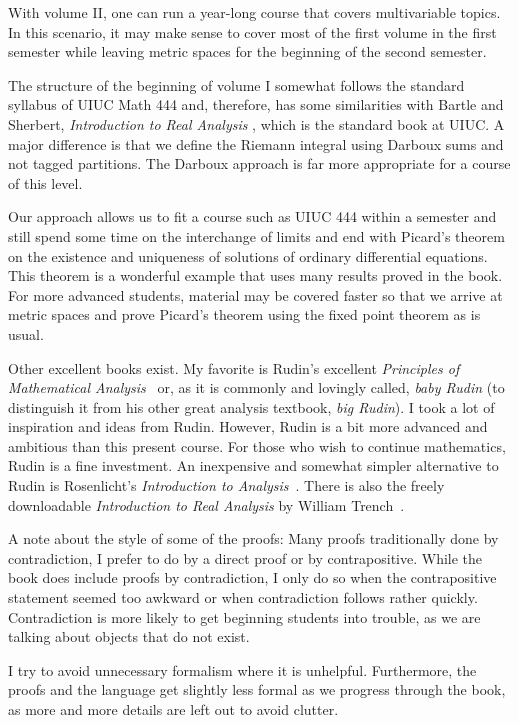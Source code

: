 With volume II\@, one can run a year-long course that covers multivariable
topics.  In this scenario, it may make sense to cover most of the first volume
in the first semester while leaving metric spaces for the beginning of the
second semester.

The structure of the beginning of volume I somewhat follows the
standard syllabus of UIUC Math 444 and, therefore, has some similarities with
Bartle and Sherbert,
\emph{Introduction to Real Analysis} \cite{BS}, which is the standard book
at UIUC\@.
A major difference is that we define the Riemann integral using
Darboux sums and not tagged partitions.  The Darboux approach is far more
appropriate for a course of this level.

Our approach allows us to fit a course such as UIUC 444 within a semester
and still spend some time on the interchange of limits and end with
Picard's theorem on the existence and uniqueness of solutions of ordinary
differential equations.
This theorem is a wonderful example
that uses many results proved in the book.  For more advanced students,
material may be covered faster so that we arrive at metric spaces and
prove Picard's theorem using the fixed point theorem as is usual.

Other excellent books exist.  My favorite is 
Rudin's excellent
\emph{Principles of Mathematical Analysis}~\cite{Rudin:baby}
or, as it is commonly and lovingly called, \emph{baby Rudin}
(to distinguish it from his other great analysis textbook,
\emph{big Rudin}).  I took a
lot of inspiration and ideas from Rudin.  However, Rudin is a bit more
advanced and ambitious than this present course.
For those who wish to continue
mathematics, Rudin is a fine investment.
An inexpensive and somewhat simpler alternative to Rudin is
Rosenlicht's \emph{Introduction to Analysis}~\cite{Rosenlicht}.
There is also the freely downloadable \emph{Introduction to Real
Analysis} by William Trench~\cite{Trench}.

\medskip

A note about the style of some of the proofs:  Many proofs
traditionally done by contradiction, I prefer to do by
a direct proof or by contrapositive.  While the book does include
proofs by contradiction, I only
do so when the contrapositive statement seemed too awkward or when 
contradiction follows rather quickly.
Contradiction is more likely to get beginning students into trouble,
as we are talking about objects that do not exist.

I try to avoid unnecessary formalism where it is unhelpful.
Furthermore, the proofs and the language get slightly less formal as we
progress through the book, as more and more details are left out to avoid
clutter.

